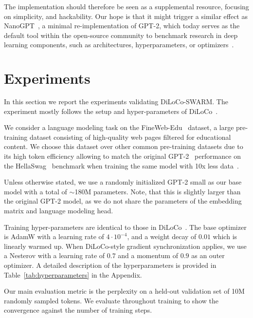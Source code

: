 \documentclass{article}
\begin{document}
The implementation should therefore be seen as a supplemental resource, focusing
on simplicity, and hackability. Our hope is that it might trigger a similar
effect as NanoGPT~\cite{nanogpt2024}, a minimal re-implementation of GPT-2,
which today serves as the default tool within the open-source community to
benchmark research in deep learning components, such as architectures,
hyperparameters, or optimizers~\cite{moddednanogpt2024}.

\section{Experiments}

In this section we report the experiments validating DiLoCo-SWARM. The experiment
mostly follows the setup and hyper-parameters of DiLoCo~\cite{douillard2023}.

We consider a language modeling task on the FineWeb-Edu~\cite{penedo2024}
dataset, a large pre-training dataset consisting of high-quality web pages
filtered for educational content. We choose this dataset over other common
pre-training datasets due to its high token efficiency allowing to match the
original GPT-2~\cite{radford2019} performance on the
HellaSwag~\cite{zellers2019} benchmark when training the same model with 10x
less data~\cite{karpathy2024}.

Unless otherwise stated, we use a randomly initialized GPT-2 small as our base
model with a total of $\sim$180M parameters. Note, that this is slightly larger
than the original GPT-2 model, as we do not share the parameters of the embedding
matrix and language modeling head.

Training hyper-parameters are identical to those in DiLoCo~\cite{douillard2023}.
The base optimizer is AdamW with a learning rate of $4\cdot 10^{-4}$, and a
weight decay of $0.01$ which is linearly warmed up. When DiLoCo-style gradient
synchronization applies, we use a Nesterov with a learning rate of $0.7$ and a
momentum of $0.9$ as an outer optimizer. A detailed description of the
hyperparameters is provided in Table~\ref{tab:hyperparameters} in the Appendix.

Our main evaluation metric is the perplexity on a held-out validation set of 10M
randomly sampled tokens. We evaluate throughout training to show the convergence
against the number of training steps.
\end{document}
